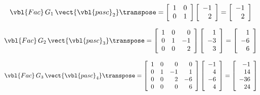\[
 \vbl{Fac}\,G_1\,\vect{\vbl{pasc}_2}\transpose =
 \left[\begin{array}{rr}
   1 & 0 \\
   0 & 1 \\
 \end{array}\right]
 \left[\begin{array}{r}
   -1 \\ 2 \\
 \end{array}\right]
 =
 \left[\begin{array}{r}
   -1 \\ 2 \\
 \end{array}\right]
\]

\[
 \vbl{Fac}\,G_2\,\vect{\vbl{pasc}_3}\transpose =
 \left[\begin{array}{rrr}
   1 & 0 &  0 \\
   0 & 1 & -1 \\
   0 & 0 &  2 \\
 \end{array}\right]
 \left[\begin{array}{r}
    1 \\ -3 \\ 3 \\
 \end{array}\right]
 =
 \left[\begin{array}{r}
    1 \\ -6 \\ 6 \\
 \end{array}\right]
\]

\[
 \vbl{Fac}\,G_3\,\vect{\vbl{pasc}_4}\transpose =
 \left[\begin{array}{rrrr}
   1 & 0 &  0 &  0 \\
   0 & 1 & -1 &  1 \\
   0 & 0 &  2 & -6 \\
   0 & 0 &  0 &  6 \\
 \end{array}\right]
 \left[\begin{array}{r}
   -1 \\ 4 \\ -6 \\ 4 \\
 \end{array}\right]
 =
 \left[\begin{array}{r}
   -1 \\ 14 \\ -36 \\ 24 \\
 \end{array}\right]
\]

